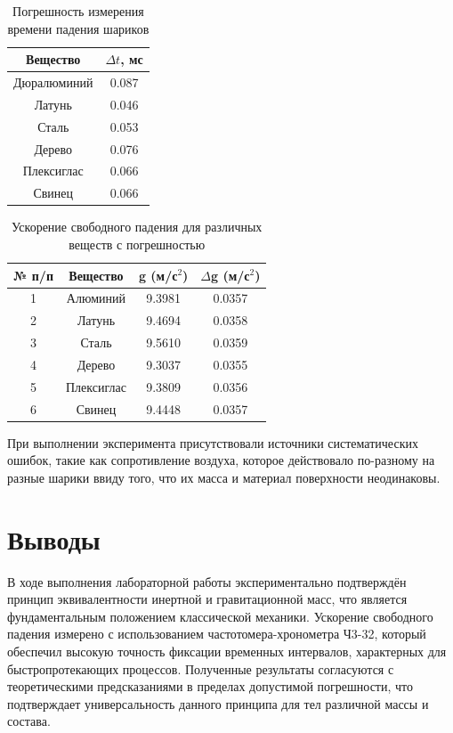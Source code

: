 \begin{table}[h!]
\centering
\begin{tabular}{|c|c|}
\hline
\textbf{Вещество} & \textbf{$\Delta t$, мс} \\ \hline
    Дюралюминий            & 0.087                 \\ \hline
    Латунь              & 0.046                   \\ \hline
    Сталь               & 0.053                   \\ \hline
    Дерево              & 0.076                   \\ \hline
    Плексиглас          & 0.066                   \\ \hline
    Свинец              & 0.066                   \\ \hline
\end{tabular}
\caption{Погрешность измерения времени падения шариков}
\end{table}

\begin{table}[htbp]
  \centering
  \label{tab:masses}
  \begin{tabular}{|c|c|c|c|}
    \hline
    № п/п & Вещество & g (м/с$^2$) & $\Delta$g (м/с$^2$) \\
    \hline
    1 & Алюминий & 9.3981 & 0.0357 \\  
    2 & Латунь & 9.4694 & 0.0358 \\  
    3 & Сталь & 9.5610 & 0.0359 \\  
    4 & Дерево & 9.3037 & 0.0355 \\  
    5 & Плексиглас & 9.3809 & 0.0356 \\  
    6 & Свинец & 9.4448 & 0.0357 \\ 
    \hline
  \end{tabular}
\caption{Ускорение свободного падения для различных веществ с погрешностью}
\end{table}




При выполнении эксперимента присутствовали источники систематических ошибок, такие как сопротивление воздуха, которое действовало по-разному на разные шарики ввиду того, что их масса и материал поверхности неодинаковы.

\clearpage
\section{Выводы}
В ходе выполнения лабораторной работы экспериментально подтверждён принцип эквивалентности инертной и гравитационной масс, что является фундаментальным положением классической механики. Ускорение свободного падения измерено с использованием частотомера-хронометра Ч3-32, который обеспечил высокую точность фиксации временных интервалов, характерных для быстропротекающих процессов. Полученные результаты согласуются с теоретическими предсказаниями в пределах допустимой погрешности, что подтверждает универсальность данного принципа для тел различной массы и состава.

